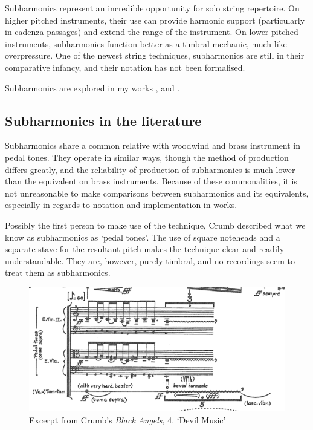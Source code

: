 Subharmonics represent an incredible opportunity for solo string repertoire. 
On higher pitched instruments, their use can provide harmonic support (particularly in cadenza passages) and extend the range of the instrument. 
On lower pitched instruments, subharmonics function better as a timbral mechanic, much like overpressure. 
One of the newest string techniques, subharmonics are still in their comparative infancy, and their notation has not been formalised. 

Subharmonics are explored in my works , and .


\subsection{Subharmonics in the literature}

Subharmonics share a common relative with woodwind and brass instrument in pedal tones.
They operate in similar ways, though the method of production differs greatly, and the reliability of production of subharmonics is much lower than the equivalent on brass instruments.
Because of these commonalities, it is not unreasonable to make comparisons between subharmonics and its equivalents, especially in regards to notation and implementation in works.

Possibly the first person to make use of the technique, Crumb described what we know as subharmonics as `pedal tones'.\autocite{crumbBlackAngelsImages1971} 
The use of square noteheads and a separate stave for the resultant pitch makes the technique clear and readily understandable.\autocite[]{crumbBlackAngels1995}
They are, however, purely timbral, and no recordings seem to treat them as subharmonics.

\begin{figure}
    \includegraphics[width=\linewidth]{./resources/crumbBlackAngels.png}
    \caption{Excerpt from Crumb's \emph{Black Angels}, 4. `Devil Music'}
    \label{fig:Excerpt from Crumb's Black Angels}
\end{figure}



